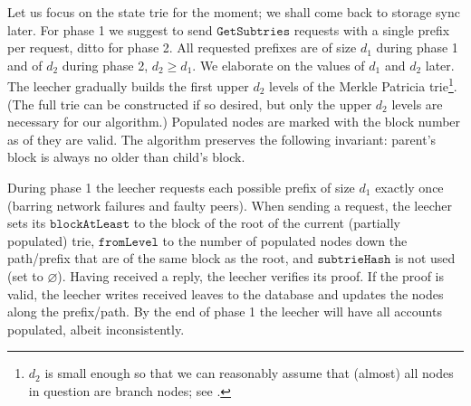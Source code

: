 \documentclass{amsart}
\begin{document}
Let us focus on the state trie for the moment; we shall come back to storage sync later.
For phase 1 we suggest to send $\texttt{GetSubtries}$ requests with a single prefix per request, ditto for phase 2.
All requested prefixes are of size $d_1$ during phase 1 and of $d_2$ during phase 2, $d_2 \geq d_1$.
We elaborate on the values of $d_1$ and $d_2$ later.
The leecher gradually builds the first upper $d_2$ levels of the Merkle Patricia trie\footnote{$d_2$
is small enough so that we can reasonably assume that (almost) all nodes in question are branch nodes;
see \cite{akhunov_1x_workshop_part2}.}.
(The full trie can be constructed if so desired, but only the upper $d_2$ levels are necessary for our algorithm.)
Populated nodes are marked with the block number as of they are valid.
The algorithm preserves the following invariant: parent's block is always no older than child's block.

During phase 1 the leecher requests each possible prefix of size $d_1$ exactly once
(barring network failures and faulty peers).
When sending a request,
the leecher sets its $\texttt{blockAtLeast}$ to the block of the root of the current (partially populated) trie,
$\texttt{fromLevel}$ to the number of populated nodes down the path/prefix that are of the same block as the root,
and $\texttt{subtrieHash}$ is not used (set to $\varnothing$).
Having received a reply, the leecher verifies its proof.
If the proof is valid, the leecher writes received leaves to the database and updates the nodes along the prefix/path.
By the end of phase 1 the leecher will have all accounts populated, albeit inconsistently.
\end{document}
